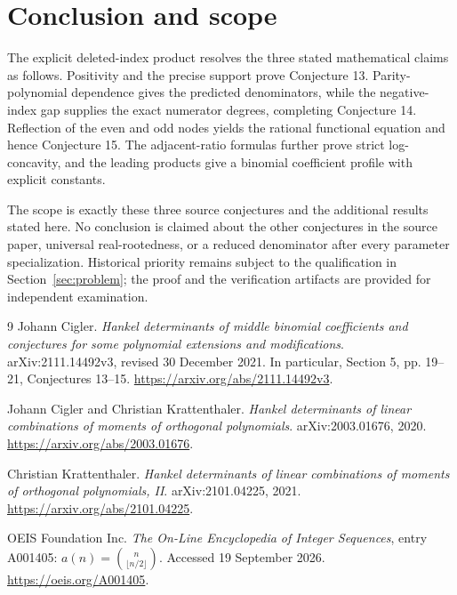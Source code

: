 \documentclass[11pt,letterpaper]{article}
\numberwithin{equation}{section}
\theoremstyle{definition}
\begin{document}
\section{Conclusion and scope}\label{sec:conclusion}
The explicit deleted-index product resolves the three stated mathematical
claims as follows. Positivity and the precise support prove Conjecture 13.
Parity-polynomial dependence gives the predicted denominators, while the
negative-index gap supplies the exact numerator degrees, completing
Conjecture 14. Reflection of the even and odd nodes yields the rational
functional equation and hence Conjecture 15. The adjacent-ratio formulas
further prove strict log-concavity, and the leading products give a
binomial coefficient profile with explicit constants.

The scope is exactly these three source conjectures and the additional
results stated here. No conclusion is claimed about the other conjectures
in the source paper, universal real-rootedness, or a reduced denominator
after every parameter specialization. Historical priority remains subject
to the qualification in Section~\ref{sec:problem}; the proof and the
verification artifacts are provided for independent examination.

\begin{thebibliography}{9}
\small
\setlength{\itemsep}{3pt}
\setlength{\parskip}{0pt}
Johann Cigler.
\emph{Hankel determinants of middle binomial coefficients and conjectures
for some polynomial extensions and modifications}.
arXiv:2111.14492v3, revised 30 December 2021.
In particular, Section 5, pp. 19--21, Conjectures 13--15.
\url{https://arxiv.org/abs/2111.14492v3}.

Johann Cigler and Christian Krattenthaler.
\emph{Hankel determinants of linear combinations of moments of orthogonal
polynomials}.
arXiv:2003.01676, 2020.
\url{https://arxiv.org/abs/2003.01676}.

Christian Krattenthaler.
\emph{Hankel determinants of linear combinations of moments of orthogonal
polynomials, II}.
arXiv:2101.04225, 2021.
\url{https://arxiv.org/abs/2101.04225}.

OEIS Foundation Inc.
\emph{The On-Line Encyclopedia of Integer Sequences}, entry A001405:
\(a(n)=\binom n{\lfloor n/2\rfloor}\).
Accessed 19 September 2026.
\url{https://oeis.org/A001405}.
\end{thebibliography}
\end{document}
